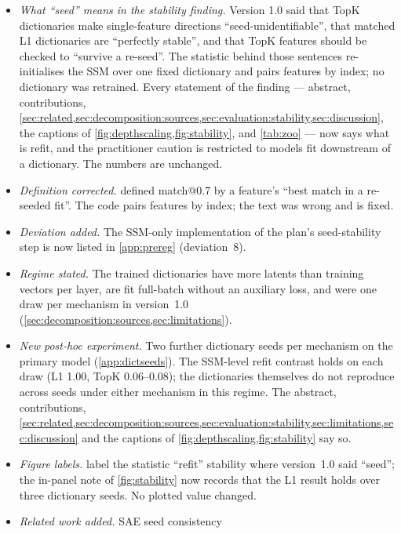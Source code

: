 \begin{itemize}
  \item \emph{What ``seed'' means in the stability finding.} Version 1.0
    said that TopK dictionaries make single-feature directions
    ``seed-unidentifiable'', that matched L1 dictionaries are ``perfectly
    stable'', and that TopK features should be checked to ``survive a
    re-seed''. The statistic behind those sentences re-initialises the SSM
    over one fixed dictionary and pairs features by index; no dictionary was
    retrained. Every statement of the finding --- abstract, contributions,
    \cref{sec:related,sec:decomposition:sources,sec:evaluation:stability,sec:discussion},
    the captions of \cref{fig:depthscaling,fig:stability}, and
    \cref{tab:zoo} --- now says what is refit, and the practitioner caution
    is restricted to models fit downstream of a dictionary. The numbers are
    unchanged.
  \item \emph{Definition corrected.}  defined match@0.7 by a
    feature's ``best match in a re-seeded fit''. The code pairs features by
    index; the text was wrong and is fixed.
  \item \emph{Deviation added.} The SSM-only implementation of the plan's
    seed-stability step is now listed in \cref{app:prereg} (deviation~8).
  \item \emph{Regime stated.} The trained dictionaries have more latents
    than training vectors per layer, are fit full-batch without an auxiliary
    loss, and were one draw per mechanism in version~1.0
    (\cref{sec:decomposition:sources,sec:limitations}).
  \item \emph{New post-hoc experiment.} Two further dictionary seeds per
    mechanism on the primary model (\cref{app:dictseeds}). The SSM-level
    refit contrast holds on each draw (L1 1.00, TopK 0.06--0.08); the
    dictionaries themselves do not reproduce across seeds under either
    mechanism in this regime. The abstract, contributions,
    \cref{sec:related,sec:decomposition:sources,sec:evaluation:stability,sec:limitations,sec:discussion}
    and the captions of \cref{fig:depthscaling,fig:stability} say so.
  \item \emph{Figure labels.}  label
    the statistic ``refit'' stability where version~1.0 said ``seed''; the
    in-panel note of \cref{fig:stability} now records that the L1 result holds
    over three dictionary seeds. No plotted value changed.
  \item \emph{Related work added.} SAE seed consistency

\end{itemize}
